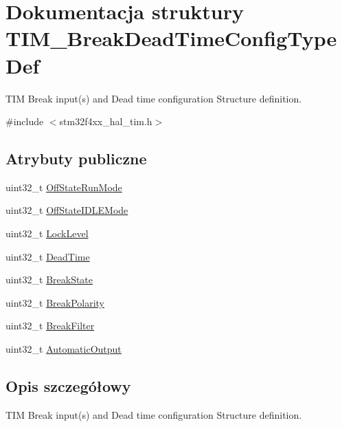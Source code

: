 \hypertarget{struct_t_i_m___break_dead_time_config_type_def}{}\section{Dokumentacja struktury T\+I\+M\+\_\+\+Break\+Dead\+Time\+Config\+Type\+Def}
\label{struct_t_i_m___break_dead_time_config_type_def}


T\+IM Break input(s) and Dead time configuration Structure definition.  




{\ttfamily \#include $<$stm32f4xx\+\_\+hal\+\_\+tim.\+h$>$}

\subsection*{Atrybuty publiczne}
\begin{DoxyCompactItemize}
\item 
uint32\+\_\+t \hyperlink{struct_t_i_m___break_dead_time_config_type_def_a5e97751b5e397414e2a5120eb5cef7c6}{Off\+State\+Run\+Mode}
\item 
uint32\+\_\+t \hyperlink{struct_t_i_m___break_dead_time_config_type_def_a49f39e31ac019b9b7a20751bfd01c6c4}{Off\+State\+I\+D\+L\+E\+Mode}
\item 
uint32\+\_\+t \hyperlink{struct_t_i_m___break_dead_time_config_type_def_ab00ae9fa5c6daa6319883863dee6e40a}{Lock\+Level}
\item 
uint32\+\_\+t \hyperlink{struct_t_i_m___break_dead_time_config_type_def_a4bdc5aec84be4b728b55028491f261d4}{Dead\+Time}
\item 
uint32\+\_\+t \hyperlink{struct_t_i_m___break_dead_time_config_type_def_a8962430194b43ac28a14c96dd9cc44e6}{Break\+State}
\item 
uint32\+\_\+t \hyperlink{struct_t_i_m___break_dead_time_config_type_def_ae15ddbf3087f9a2129a52a1317339ea7}{Break\+Polarity}
\item 
uint32\+\_\+t \hyperlink{struct_t_i_m___break_dead_time_config_type_def_aad8158e694a62f6c071975ee4c2e5b6a}{Break\+Filter}
\item 
uint32\+\_\+t \hyperlink{struct_t_i_m___break_dead_time_config_type_def_ae591f2368d0be5b77d8a746e73eabe71}{Automatic\+Output}
\end{DoxyCompactItemize}


\subsection{Opis szczegółowy}
T\+IM Break input(s) and Dead time configuration Structure definition. 

